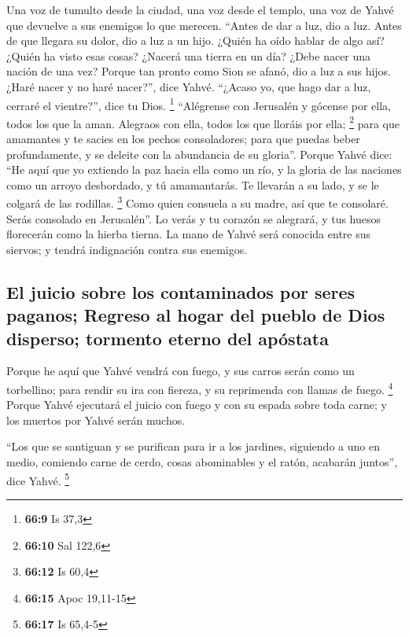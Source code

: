  Una voz de tumulto desde la ciudad, una voz desde el
templo, una voz de Yahvé que devuelve a sus enemigos lo que merecen.
 ``Antes de dar a luz, dio a luz. Antes de que llegara su
dolor, dio a luz a un hijo.  ¿Quién ha oído hablar de algo
así? ¿Quién ha visto esas cosas? ¿Nacerá una tierra en un día? ¿Debe
nacer una nación de una vez? Porque tan pronto como Sion se afanó, dio a
luz a sus hijos.  ¿Haré nacer y no haré nacer?'', dice
Yahvé. ``¿Acaso yo, que hago dar a luz, cerraré el vientre?'', dice tu
Dios. \footnote{\textbf{66:9} Is 37,3}  ``Alégrense con
Jerusalén y gócense por ella, todos los que la aman. Alegraos con ella,
todos los que lloráis por ella; \footnote{\textbf{66:10} Sal 122,6}
 para que amamantes y te sacies en los pechos
consoladores; para que puedas beber profundamente, y se deleite con la
abundancia de su gloria''.  Porque Yahvé dice: ``He aquí
que yo extiendo la paz hacia ella como un río, y la gloria de las
naciones como un arroyo desbordado, y tú amamantarás. Te llevarán a su
lado, y se le colgará de las rodillas. \footnote{\textbf{66:12} Is 60,4}
 Como quien consuela a su madre, así que te consolaré.
Serás consolado en Jerusalén''.  Lo verás y tu corazón se
alegrará, y tus huesos florecerán como la hierba tierna. La mano de
Yahvé será conocida entre sus siervos; y tendrá indignación contra sus
enemigos.

\hypertarget{el-juicio-sobre-los-contaminados-por-seres-paganos-regreso-al-hogar-del-pueblo-de-dios-disperso-tormento-eterno-del-apuxf3stata}{%
\subsection{El juicio sobre los contaminados por seres paganos; Regreso
al hogar del pueblo de Dios disperso; tormento eterno del
apóstata}\label{el-juicio-sobre-los-contaminados-por-seres-paganos-regreso-al-hogar-del-pueblo-de-dios-disperso-tormento-eterno-del-apuxf3stata}}

 Porque he aquí que Yahvé vendrá con fuego, y sus carros
serán como un torbellino; para rendir su ira con fiereza, y su
reprimenda con llamas de fuego. \footnote{\textbf{66:15} Apoc 19,11-15}
 Porque Yahvé ejecutará el juicio con fuego y con su
espada sobre toda carne; y los muertos por Yahvé serán muchos.

 ``Los que se santiguan y se purifican para ir a los
jardines, siguiendo a uno en medio, comiendo carne de cerdo, cosas
abominables y el ratón, acabarán juntos'', dice Yahvé. \footnote{\textbf{66:17}
  Is 65,4-5}

